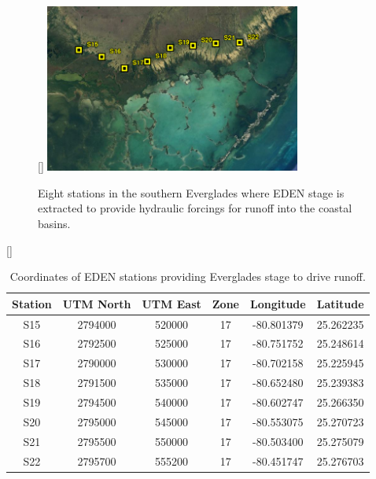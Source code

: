 \begin{figure}[H]
  [\FBwidth]
  {
     \includegraphics[width=0.75\textwidth]{graphics/EDEN_Stations.png}
  }
  {
     \caption{ \newline \newline Eight stations in the southern Everglades 
               where EDEN stage is extracted to provide hydraulic forcings 
               for runoff into the coastal basins. }
     \label{fig:EDEN Stations}
  }
\end{figure}

\begin{table}[H]
  [\FBwidth]
  {
     \caption{ Coordinates of EDEN stations providing Everglades stage 
               to drive runoff. }
     \label{table:EDEN Stations}
  }
  {
    \centering
    \begin{tabular}{ c c c c c c }
      \hline
      Station & UTM North & UTM East & Zone & Longitude  & Latitude\\
      \hline
      S15     & 2794000   & 520000   & 17   & -80.801379 & 25.262235\\
      S16     & 2792500   & 525000   & 17   & -80.751752 & 25.248614\\
      S17     & 2790000   & 530000   & 17   & -80.702158 & 25.225945\\
      S18     & 2791500   & 535000   & 17   & -80.652480 & 25.239383\\
      S19     & 2794500   & 540000   & 17   & -80.602747 & 25.266350\\
      S20     & 2795000   & 545000   & 17   & -80.553075 & 25.270723\\
      S21     & 2795500   & 550000   & 17   & -80.503400 & 25.275079\\
      S22     & 2795700   & 555200   & 17   & -80.451747 & 25.276703\\
      \hline
    \end{tabular} 
  }
\end{table}

